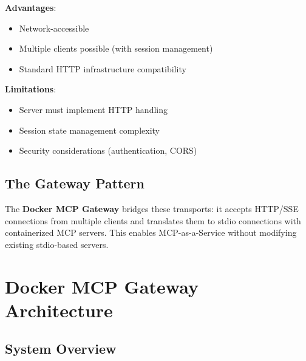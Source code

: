 \documentclass[11pt,letterpaper]{article}
\begin{document}
\textbf{Advantages}:
\begin{itemize}[noitemsep]
    \item Network-accessible
    \item Multiple clients possible (with session management)
    \item Standard HTTP infrastructure compatibility
\end{itemize}

\textbf{Limitations}:
\begin{itemize}[noitemsep]
    \item Server must implement HTTP handling
    \item Session state management complexity
    \item Security considerations (authentication, CORS)
\end{itemize}

\subsection{The Gateway Pattern}

The \textbf{Docker MCP Gateway} bridges these transports: it accepts HTTP/SSE connections from multiple clients and translates them to stdio connections with containerized MCP servers. This enables MCP-as-a-Service without modifying existing stdio-based servers.

\section{Docker MCP Gateway Architecture}

\subsection{System Overview}
\end{document}
